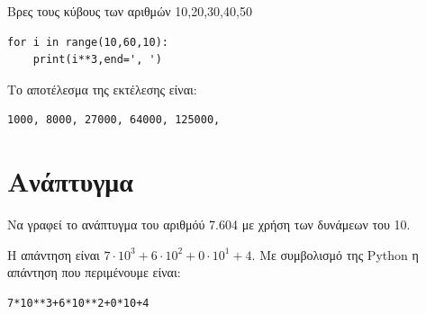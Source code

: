 \begin{exercise}
Βρες τους κύβους των αριθμών 10,20,30,40,50
\end{exercise}

\begin{lstlisting}
for i in range(10,60,10):
    print(i**3,end=', ')  
\end{lstlisting}
Το αποτέλεσμα της εκτέλεσης είναι:
\begin{lstlisting}
1000, 8000, 27000, 64000, 125000, 
\end{lstlisting}

\section{Ανάπτυγμα}
\begin{exercise}Να γραφεί το ανάπτυγμα του αριθμόύ 7.604 με χρήση των δυνάμεων του 10.
\end{exercise}
Η απάντηση είναι $7\cdot 10^3 + 6\cdot 10^2 + 0\cdot 10^1 + 4$.  Με συμβολισμό της Python η απάντηση που περιμένουμε είναι:
\begin{lstlisting}
7*10**3+6*10**2+0*10+4
\end{lstlisting}



